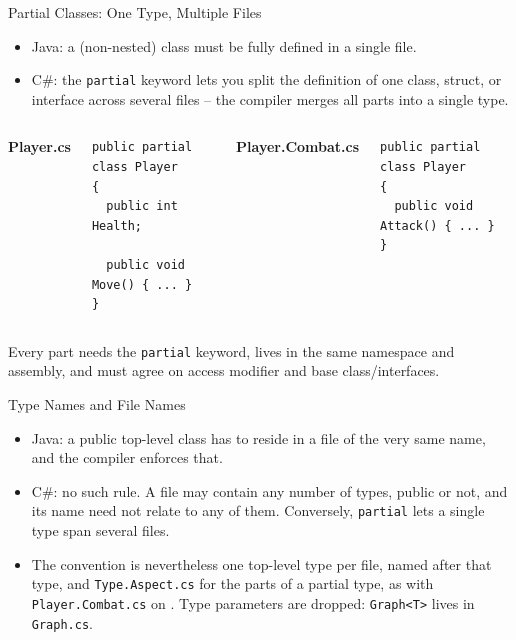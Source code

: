 \begin{frame}[fragile]{Partial Classes: One Type, Multiple Files}
  \begin{itemize}
    \item Java: a (non-nested) class must be fully defined in a single file.
    \item C\#: the \texttt{partial} keyword lets you split the definition
      of one class, struct, or interface across several files -- the
      compiler merges all parts into a single type.
  \end{itemize}
  \begin{columns}[T]
      \textbf{Player.cs}
      \begin{lstlisting}
public partial class Player
{
  public int Health;

  public void Move() { ... }
}
      \end{lstlisting}
      \textbf{Player.Combat.cs}
      \begin{lstlisting}
public partial class Player
{
  public void Attack() { ... }
}
      \end{lstlisting}
  \end{columns}

  Every part needs the \texttt{partial} keyword, lives in the
  same namespace and assembly, and must agree on access modifier
  and base class/interfaces.


\end{frame}

\begin{frame}{Type Names and File Names}
  \begin{itemize}
    \item Java: a public top-level class has to reside in a file of the very
      same name, and the compiler enforces that.
    \item C\#: no such rule. A file may contain any number of types, public or
      not, and its name need not relate to any of them. Conversely,
      \texttt{partial} lets a single type span several files.
    \item The convention is nevertheless one top-level type per file, named
      after that type, and \texttt{Type.Aspect.cs} for the parts of a partial
      type, as with \texttt{Player.Combat.cs} on . Type
      parameters are
      dropped: \texttt{Graph<T>} lives in \texttt{Graph.cs}.
  \end{itemize}

  \vspace{1ex}

\end{frame}

